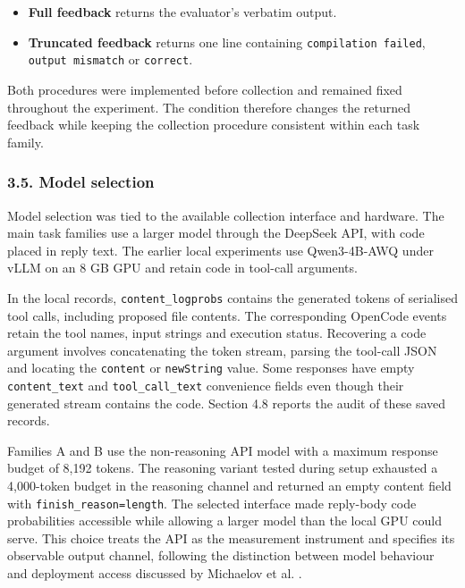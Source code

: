 \documentclass[
  11pt,
]{article}
\providecommand{\tightlist}{%
  \setlength{\itemsep}{0pt}\setlength{\parskip}{0pt}}
\begin{document}
\begin{itemize}
\tightlist
\item
  \textbf{Full feedback} returns the evaluator's verbatim output.
\item
  \textbf{Truncated feedback} returns one line containing
  \texttt{compilation\ failed}, \texttt{output\ mismatch} or
  \texttt{correct}.
\end{itemize}

Both procedures were implemented before collection and remained fixed
throughout the experiment. The condition therefore changes the returned
feedback while keeping the collection procedure consistent within each
task family.

\hypertarget{model-selection}{%
\subsubsection{3.5. Model selection}\label{model-selection}}

Model selection was tied to the available collection interface and
hardware. The main task families use a larger model through the DeepSeek
API, with code placed in reply text. The earlier local experiments use
Qwen3-4B-AWQ under vLLM on an 8 GB GPU and retain code in tool-call
arguments.

In the local records, \texttt{content\_logprobs} contains the generated
tokens of serialised tool calls, including proposed file contents. The
corresponding OpenCode events retain the tool names, input strings and
execution status. Recovering a code argument involves concatenating the
token stream, parsing the tool-call JSON and locating the
\texttt{content} or \texttt{newString} value. Some responses have empty
\texttt{content\_text} and \texttt{tool\_call\_text} convenience fields
even though their generated stream contains the code. Section 4.8
reports the audit of these saved records.

Families A and B use the non-reasoning API model with a maximum response
budget of 8,192 tokens. The reasoning variant tested during setup
exhausted a 4,000-token budget in the reasoning channel and returned an
empty content field with \texttt{finish\_reason=length}. The selected
interface made reply-body code probabilities accessible while allowing a
larger model than the local GPU could serve. This choice treats the API
as the measurement instrument and specifies its observable output
channel, following the distinction between model behaviour and
deployment access discussed by Michaelov et al. \citep{howopen}.
\end{document}
